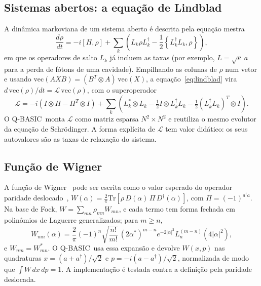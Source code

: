 \documentclass[11pt,a4paper]{article}
\newcommand{\qbasic}{\textsc{Q-BASIC}}
\begin{document}
\subsection{Sistemas abertos: a equação de Lindblad}

A dinâmica markoviana de um sistema aberto é descrita pela equação
mestra~\cite{lindblad1976,gorini1976}
\begin{equation}
  \frac{d\rho}{dt} = -i[H, \rho] + \sum_k \left( L_k \rho L_k^\dagger
  - \frac{1}{2}\left\{L_k^\dagger L_k, \rho\right\} \right),
  \label{eq:lindblad}
\end{equation}
em que os operadores de salto $L_k$ já incluem as taxas (por exemplo,
$L = \sqrt{\kappa}\,a$ para a perda de fótons de uma cavidade). Empilhando as colunas de
$\rho$ num vetor e usando $\mathrm{vec}(AXB) = (B^T \otimes A)\,\mathrm{vec}(X)$, a
equação~\eqref{eq:lindblad} vira $d\,\mathrm{vec}(\rho)/dt = \mathcal{L}\,\mathrm{vec}(\rho)$,
com o superoperador
\begin{equation}
  \mathcal{L} = -i\left(I \otimes H - H^T \otimes I\right)
  + \sum_k \left( L_k^* \otimes L_k - \tfrac{1}{2} I \otimes L_k^\dagger L_k
  - \tfrac{1}{2} (L_k^\dagger L_k)^T \otimes I \right).
\end{equation}
O \qbasic\ monta $\mathcal{L}$ como matriz esparsa $N^2 \times N^2$ e reutiliza o mesmo
evolutor da equação de Schrödinger. A forma explícita de $\mathcal{L}$ tem valor didático:
os seus autovalores são as taxas de relaxação do sistema.

\subsection{Função de Wigner}

A função de Wigner~\cite{wigner1932} pode ser escrita como o valor esperado do operador
paridade deslocado~\cite{cahill1969},
$W(\alpha) = \frac{2}{\pi}\mathrm{Tr}\left[\rho\, D(\alpha)\,\Pi\, D^\dagger(\alpha)\right]$,
com $\Pi = (-1)^{a^\dagger a}$. Na base de Fock, $W = \sum_{mn}\rho_{mn}W_{mn}$, e cada
termo tem forma fechada em polinômios de Laguerre generalizados; para $m \geq n$,
\begin{equation}
  W_{mn}(\alpha) = \frac{2}{\pi}(-1)^n \sqrt{\frac{n!}{m!}}\,(2\alpha^*)^{m-n}
  e^{-2|\alpha|^2} L_n^{(m-n)}\!\left(4|\alpha|^2\right),
\end{equation}
e $W_{nm} = W_{mn}^*$. O \qbasic\ usa essa expansão e devolve $W(x, p)$ nas quadraturas
$x = (a + a^\dagger)/\sqrt{2}$ e $p = -i(a - a^\dagger)/\sqrt{2}$, normalizada de modo
que $\int W\,dx\,dp = 1$. A implementação é testada contra a definição pela paridade
deslocada.
\end{document}
